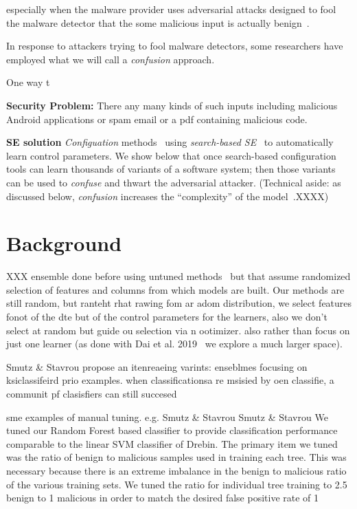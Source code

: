   
  especially when the malware provider
  uses adversarial attacks designed to fool the malware detector that
  the   some malicious input  is actually benign~\cite{wang2019security}.
  
  In response to attackers trying to fool malware detectors, some researchers have employed what we will call a {\em confusion}
  approach. 
  
 One way t
 \bi
 \item {\bf Security Problem:}
 There any many kinds of such inputs including  malicious Android applications or spam email or a pdf containing malicious code.
 \item {\bf SE solution}  {\em Configuation} methods~\cite{nair2018finding,harman2010search,nair2018data} using  {\em search-based SE}~\cite{chen2018beyond,nair16,harman2010search} to automatically learn  control parameters. 
We show below that once search-based configuration tools
 can learn   thousands of variants
 of a software system; then those variants can be used to {\em confuse} and  thwart the adversarial attacker. 
 \ei
 (Technical aside: as discussed below, {\em confusion} increases the ``complexity'' of the model~\cite{demontis2019adversarial}.XXXX)
 
 
 
  
\section{Background}




 
 XXX ensemble done before using untuned methods~\cite{Smutz2016WhenAT,euh2020comparative} but that assume randomized selection of features and columns from which models are built. Our methods are still random, but ranteht rhat rawing fom ar adom distribution, we select features fonot of the dte but of the control parameters for the learners, also we don't select at random but guide ou selection via n ootimizer. also rather than focus on just one learner (as done with Dai et al. 2019~\cite{dai19} we explore a much larger space).
 
 Smutz \& Stavrou propose an itenreaeing varints: enseblmes focusing on ksiclassifeird prio examples. when classificationsa re msisied by oen classifie, a communit pf clasisfiers can still succesed
 
 sme examples of manual tuning. e.g.  Smutz \& Stavrou  Smutz \& Stavrou We tuned our Random Forest based classifier to provide classification performance comparable to the linear SVM classifier of Drebin. The primary item we tuned was the ratio of benign to malicious samples used in training each tree. This was necessary because there is an extreme imbalance in the benign to malicious ratio of the various training sets. We tuned the ratio for individual tree training to 2.5 benign to 1 malicious in order to match the desired false positive rate of 1%
 
